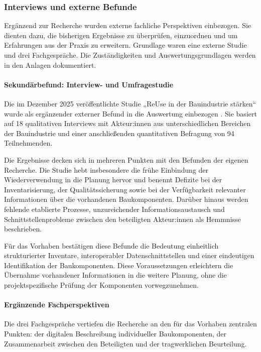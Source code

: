 \documentclass[type=zwischenbericht]{zukunftbau}
\begin{document}
\subsubsection{Interviews und externe Befunde}
Ergänzend zur Recherche wurden externe fachliche Perspektiven einbezogen. Sie dienten dazu, die bisherigen Ergebnisse zu überprüfen, einzuordnen und um Erfahrungen aus der Praxis zu erweitern. Grundlage waren eine externe Studie und drei Fachgespräche. Die Zuständigkeiten und Auswertungsgrundlagen werden in den Anlagen dokumentiert.

\begin{SemioNest}
\paragraph{Sekundärbefund: Interview- und Umfragestudie}
Die im Dezember 2025 veröffentlichte Studie „ReUse in der Bauindustrie stärken“ wurde als ergänzender externer Befund in die Auswertung einbezogen \cite{baselcircular-reuse-2025}. Sie basiert auf 18 qualitativen Interviews mit Akteur:innen aus unterschiedlichen Bereichen der Bauindustrie und einer anschließenden quantitativen Befragung von 94 Teilnehmenden.

Die Ergebnisse decken sich in mehreren Punkten mit den Befunden der eigenen Recherche. Die Studie hebt insbesondere die frühe Einbindung der Wiederverwendung in die Planung hervor und benennt Defizite bei der Inventarisierung, der Qualitätssicherung sowie bei der Verfügbarkeit relevanter Informationen über die vorhandenen Baukomponenten. Darüber hinaus werden fehlende etablierte Prozesse, unzureichender Informationsaustausch und Schnittstellenprobleme zwischen den beteiligten Akteur:innen als Hemmnisse beschrieben.

Für das Vorhaben bestätigen diese Befunde die Bedeutung einheitlich strukturierter Inventare, interoperabler Datenschnittstellen und einer eindeutigen Identifikation der Baukomponenten. Diese Voraussetzungen erleichtern die Übernahme vorhandener Informationen in die weitere Planung, ohne die projektspezifische Prüfung der Komponenten vorwegzunehmen.

\paragraph{Ergänzende Fachperspektiven}
Die drei Fachgespräche vertiefen die Recherche an den für das Vorhaben zentralen Punkten: der digitalen Beschreibung individueller Baukomponenten, der Zusammenarbeit zwischen den Beteiligten und der tragwerklichen Beurteilung.


\end{SemioNest}
\end{document}

